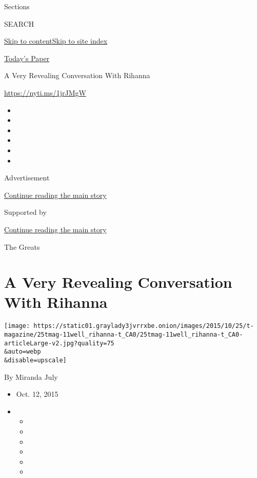 Sections

SEARCH

\protect\hyperlink{site-content}{Skip to
content}\protect\hyperlink{site-index}{Skip to site index}

\href{https://myaccount.nytimes3xbfgragh.onion/auth/login?response_type=cookie\&client_id=vi}{}

\href{https://www.nytimes3xbfgragh.onion/section/todayspaper}{Today's
Paper}

A Very Revealing Conversation With Rihanna

\url{https://nyti.ms/1jrJMgW}

\begin{itemize}
\item
\item
\item
\item
\item
\item
\end{itemize}

Advertisement

\protect\hyperlink{after-top}{Continue reading the main story}

Supported by

\protect\hyperlink{after-sponsor}{Continue reading the main story}

The Greats

\hypertarget{a-very-revealing-conversation-with-rihanna}{%
\section{A Very Revealing Conversation With
Rihanna}\label{a-very-revealing-conversation-with-rihanna}}

\texttt{[image: https://static01.graylady3jvrrxbe.onion/images/2015/10/25/t-magazine/25tmag-11well\_rihanna-t\_CA0/25tmag-11well\_rihanna-t\_CA0-articleLarge-v2.jpg?quality=75\\\&auto=webp\\\&disable=upscale]}

By Miranda July

\begin{itemize}
\item
  Oct. 12, 2015
\item
  \begin{itemize}
  \item
  \item
  \item
  \item
  \item
  \item
  \end{itemize}
\end{itemize}

